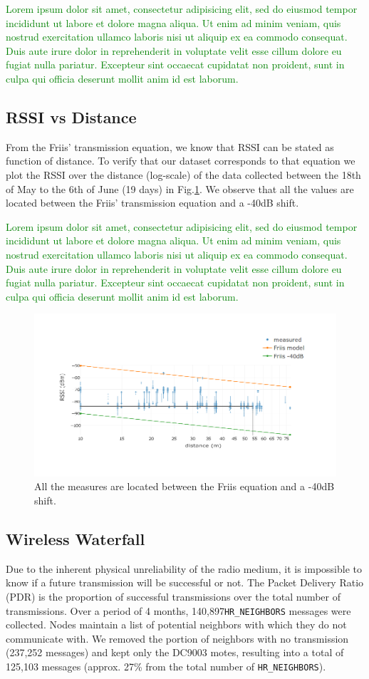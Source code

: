 \documentclass{sig-alternate}
\newcommand{\lorem}          {\textcolor{green}{Lorem ipsum dolor sit amet, consectetur adipisicing elit, sed do eiusmod tempor incididunt ut labore et dolore magna aliqua. Ut enim ad minim veniam, quis nostrud exercitation ullamco laboris nisi ut aliquip ex ea commodo consequat. Duis aute irure dolor in reprehenderit in voluptate velit esse cillum dolore eu fugiat nulla pariatur. Excepteur sint occaecat cupidatat non proident, sunt in culpa qui officia deserunt mollit anim id est laborum.}}
\newcommand{\HRNEIGHBORS}    {{\tt HR\_NEIGHBORS}\xspace}
\newcommand{\HRNEIGHBORSTOTALNUMBER}     {140,897}
\begin{document}
\lorem

\subsection{RSSI vs Distance}
\label{sec:rssi_distance}

From the Friis' transmission equation, we know that RSSI can be stated as function of distance.
To verify that our dataset corresponds to that equation we plot the RSSI over the distance (log-scale) of the data collected between the 18th of May to the 6th of June (19 days) in Fig.\ref{fig:pister_hack}.
We observe that all the values are located between the Friis' transmission equation and a -40dB shift.

\lorem

\begin{figure}
    \centering
    \includegraphics[width=\columnwidth]{pister_hack}
    \caption{All the measures are located between the Friis equation and a -40dB shift.}
    \label{fig:pister_hack}
\end{figure}

\subsection{Wireless Waterfall}


Due to the inherent physical unreliability of the radio medium, it is impossible to know if a future transmission will be successful or not.
The Packet Delivery Ratio (PDR) is the proportion of successful transmissions over the total number of transmissions.
Over a period of 4 months, \HRNEIGHBORSTOTALNUMBER \HRNEIGHBORS messages were collected.
Nodes maintain a list of potential neighbors with which they do not communicate with.
We removed the portion of neighbors with no transmission (237,252 messages) and kept only the DC9003 motes, resulting into a total of 125,103 messages (approx. 27\% from the total number of \HRNEIGHBORS).
\end{document}
